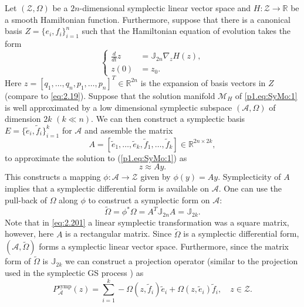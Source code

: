 Let $(\mathcal Z,\Omega)$ be a $2n$-dimensional symplectic linear vector space and $H: \mathcal Z \to \mathbb R$ be a smooth Hamiltonian function. Furthermore, suppose that there is a canonical basis $Z = \{e_i,f_i\}_{i=1}^n$ such that the Hamiltonian equation of evolution takes the form
\begin{equation} \label{p1.eq:SyMo:1}
	\left\{
	\begin{aligned}
		\frac d {dt} z &= \mathbb J_{2n} \nabla_z H(z), \\
		z(0) &= z_0.
	\end{aligned}
	\right.
\end{equation}
Here $z = [q_1,\dots,q_n,p_1,\dots,p_n]^T\in \mathbb R^{2n}$ is the expansion of basis vectors in $Z$ (compare to \eqref{eq:2.19}). Suppose that the solution manifold $\mathcal M_H$ of \eqref{p1.eq:SyMo:1} is well approximated by a low dimensional symplectic subspace $(\mathcal A,\Omega)$ of dimension $2k$ $(k\ll n)$. We can then construct a symplectic basis $E=\{ \tilde e_i,\tilde f_i \}_{i=1}^k$ for $\mathcal A$ and assemble the matrix
\begin{equation} \label{p1.eq:SyMo:1.1}
	A = [\tilde e_1,\dots,\tilde e_k,\tilde f_1,\dots,\tilde f_k]\in \mathbb R^{2n\times 2k},
\end{equation} \label{p1.eq:SyMo:1.2}
to approximate the solution to (\ref{p1.eq:SyMo:1}) as
\begin{equation} \label{eq:SyMo:1.2}
	z \approx A y.
\end{equation}
This constructs a mapping $\phi:\mathcal A \to \mathcal Z$ given by $\phi(y) = Ay$. Symplecticity of $A$ implies that a symplectic differential form is available on $\mathcal A$. One can use the pull-back of $\Omega$ along $\phi$ to construct a symplectic form on $\mathcal A$:
\begin{equation} \label{p1.eq:SyMo:1.3}
	\tilde \Omega = \phi^*\Omega = A^T \mathbb J_{2n} A = \mathbb J_{2k}.
\end{equation}
Note that in \eqref{eq:2.201} a linear symplectic transformation was a square matrix, however, here $A$ is a rectangular matrix. Since $\tilde \Omega$ is a symplectic differential form, $(\mathcal A, \tilde \Omega)$ forms a symplectic linear vector space. Furthermore, since the matrix form of $\tilde \Omega$ is $\mathbb J_{2k}$ we can construct a projection operator (similar to the projection used in the symplectic GS process ) as
\begin{equation} \label{p1.eq:SyMo:1.4}
	P^{\text{symp}}_{\mathcal A}(z) = \sum_{i=1}^k -\Omega(z,\tilde f_i)\tilde e_i + \Omega(z,\tilde e_i) \tilde f_i, \quad z\in \mathcal Z.
\end{equation}
